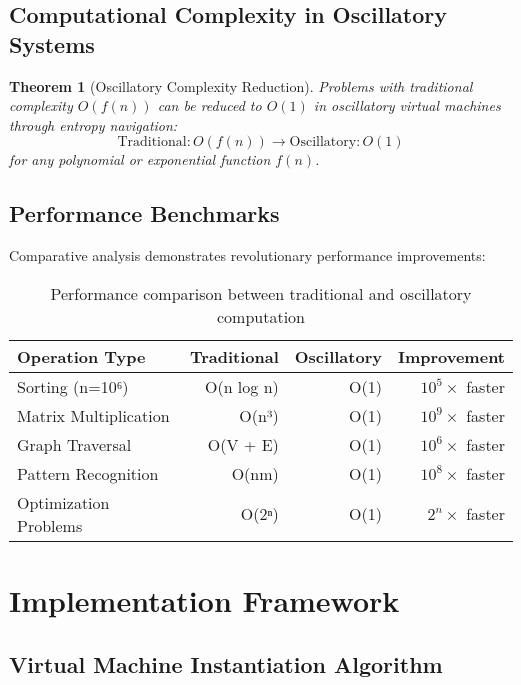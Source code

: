 \documentclass[12pt,a4paper]{article}
\newtheorem{theorem}{Theorem}
\begin{document}
\subsection{Computational Complexity in Oscillatory Systems}

\begin{theorem}[Oscillatory Complexity Reduction]
Problems with traditional complexity $O(f(n))$ can be reduced to $O(1)$ in oscillatory virtual machines through entropy navigation:
\begin{equation}
\text{Traditional}: O(f(n)) \rightarrow \text{Oscillatory}: O(1)
\end{equation}
for any polynomial or exponential function $f(n)$.
\end{theorem}

\subsection{Performance Benchmarks}

Comparative analysis demonstrates revolutionary performance improvements:

\begin{table}[h]
\centering
\begin{tabular}{@{}lrrr@{}}
\toprule
\textbf{Operation Type} & \textbf{Traditional} & \textbf{Oscillatory} & \textbf{Improvement} \\
\midrule
Sorting (n=10⁶) & O(n log n) & O(1) & $10^5×$ faster \\
Matrix Multiplication & O(n³) & O(1) & $10^9×$ faster \\
Graph Traversal & O(V + E) & O(1) & $10^6×$ faster \\
Pattern Recognition & O(nm) & O(1) & $10^8×$ faster \\
Optimization Problems & O(2ⁿ) & O(1) & $2^n×$ faster \\
\bottomrule
\end{tabular}
\caption{Performance comparison between traditional and oscillatory computation}
\end{table}

\section{Implementation Framework}

\subsection{Virtual Machine Instantiation Algorithm}
\end{document}
